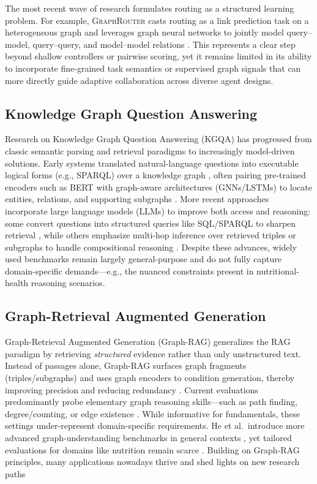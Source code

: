 \documentclass[11pt]{article}
\begin{document}
The most recent wave of research formulates routing as a structured learning problem. For example, \textsc{GraphRouter} casts routing as a link prediction task on a heterogeneous graph and leverages graph neural networks to jointly model query–model, query–query, and model–model relations \citep{feng2024graphrouter}. This represents a clear step beyond shallow controllers or pairwise scoring, yet it remains limited in its ability to incorporate fine-grained task semantics or supervised graph signals that can more directly guide adaptive collaboration across diverse agent designs. 

\subsection{Knowledge Graph Question Answering}
Research on Knowledge Graph Question Answering (KGQA) has progressed from classic semantic parsing and retrieval paradigms to increasingly model-driven solutions. Early systems translated natural-language questions into executable logical forms (e.g., SPARQL) over a knowledge graph \cite{sun2019pullnet, zhang2022subgraph}, often pairing pre-trained encoders such as BERT with graph-aware architectures (GNNs/LSTMs) to locate entities, relations, and supporting subgraphs \cite{yasunaga2021qa, taunk2023grapeqa}.  
More recent approaches incorporate large language models (LLMs) to improve both access and reasoning: some convert questions into structured queries like SQL/SPARQL to sharpen retrieval \cite{jiang2023structgpt, wang2023knowledgpt}, while others emphasize multi-hop inference over retrieved triples or subgraphs to handle compositional reasoning \cite{kim2023kg, gao2024two}. Despite these advances, widely used benchmarks remain largely general-purpose and do not fully capture domain-specific demands—e.g., the nuanced constraints present in nutritional-health reasoning scenarios.

\subsection{Graph-Retrieval Augmented Generation}
Graph-Retrieval Augmented Generation (Graph-RAG) generalizes the RAG paradigm \cite{lewis2020retrieval, ni2025towards} by retrieving \emph{structured} evidence rather than only unstructured text. Instead of passages alone, Graph-RAG surfaces graph fragments (triples/subgraphs) and uses graph encoders to condition generation, thereby improving precision and reducing redundancy \cite{guo2024knowledgenavigator, wen2023mindmap, lazaridou2022internet, liu2024can}.  
Current evaluations predominantly probe elementary graph reasoning skills—such as path finding, degree/counting, or edge existence \cite{fatemi2023talk, wang2024can, wang2025can}. While informative for fundamentals, these settings under-represent domain-specific requirements. He et al.\ introduce more advanced graph-understanding benchmarks in general contexts \cite{he2024g}, yet tailored evaluations for domains like nutrition remain scarce \cite{zhang2024mopi, zhang2024ngqa}. Building on Graph-RAG principles, many applications nowadays thrive and shed lights on new research paths \cite{zhang2024diet}
\end{document}
